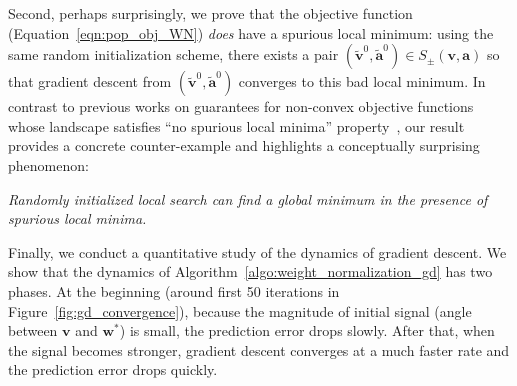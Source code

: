 \documentclass{article}
\newcommand{\firstlayer}{w}
\newcommand{\firstlayerWN}{v}
\newcommand{\secondlayer}{a}
\def\va{\mathbf{a}}
\def\vv{\mathbf{v}}
\newcommand{\vect}[1]{\mathbf{#1}}
\begin{document}
Second, perhaps surprisingly, we prove that the objective function (Equation~\eqref{eqn:pop_obj_WN}) \emph{does} have a spurious local minimum: using the same random initialization scheme, there exists a pair $(\vect{\tilde \firstlayerWN}^{0},\vect{\tilde \secondlayer}^{0}) \in S_\pm(\vv, \va)$ so that gradient descent from $(\vect{\tilde\firstlayerWN}^0,\vect{\tilde\secondlayer}^0)$ converges to this bad local minimum.
In contrast to previous works on guarantees for non-convex objective functions whose landscape satisfies ``no spurious local minima'' property~\citep{li2016symmetry,ge2017no,ge2016matrix,bhojanapalli2016global,ge2017learning,kawaguchi2016deep}, our result provides a concrete counter-example and highlights a conceptually surprising phenomenon:
\begin{center}
\emph{Randomly initialized local search can find a global minimum in the presence of spurious local minima.}
\end{center}

Finally, we conduct a quantitative study of the dynamics of gradient descent.
We show that the dynamics of Algorithm~\ref{algo:weight_normalization_gd} has two phases.
At the beginning (around first 50 iterations in Figure~\ref{fig:gd_convergence}), because the magnitude of initial signal (angle between $\vect{\firstlayerWN}$ and $\vect{\firstlayer}^*$) is small, the prediction error drops slowly.
After that, when the signal becomes stronger, gradient descent converges at a much faster rate and the prediction error drops quickly.
\end{document}
